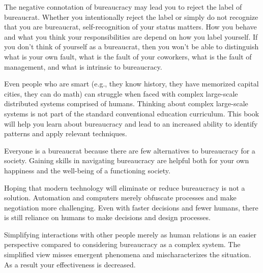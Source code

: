The negative connotation of bureaucracy may lead you to reject the label of bureaucrat. Whether you intentionally reject the label or simply do not recognize that you are bureaucrat, self-recognition of your status matters. How you behave and what you think your responsibilities are depend on how you label yourself.
If you don't think of yourself as a bureaucrat, then you won't be able to distinguish what is your own fault, what is the fault of your coworkers, what is the fault of management, and what is intrinsic to bureaucracy. 


Even people who are smart (e.g., they know history, they have memorized capital cities, they can do math) can struggle when faced with complex large-scale distributed systems comprised of humans. Thinking about complex large-scale systems is not part of the standard conventional education curriculum. This book will help you learn about bureaucracy and lead to an increased ability to identify patterns and apply relevant techniques.

Everyone is a bureaucrat because there are few alternatives to bureaucracy for a society. Gaining skills in navigating bureaucracy are helpful both for your own happiness and the well-being of a functioning society. 

Hoping that modern technology will eliminate or reduce bureaucracy is not a solution. Automation and computers merely obfuscate processes and make negotiation more challenging. Even with faster decisions and fewer humans, there is still reliance on humans to make decisions and design processes.

Simplifying interactions with other people merely as human relations is an easier perspective compared to considering bureaucracy as a complex system.
The simplified view misses emergent phenomena and mischaracterizes the situation. As a result your effectiveness is decreased.





